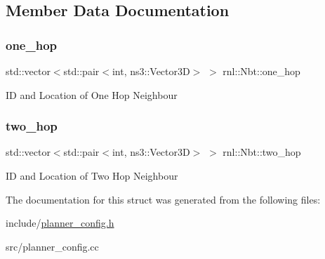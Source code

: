 \subsection{Member Data Documentation}
\mbox{\label{structrnl_1_1Nbt_aa79b864e630fe823883bb9dd511116c1}} 
\subsubsection{\texorpdfstring{one\+\_\+hop}{one\_hop}}
{\footnotesize\ttfamily std\+::vector$<$std\+::pair$<$int, ns3\+::\+Vector3D$>$ $>$ rnl\+::\+Nbt\+::one\+\_\+hop}

ID and Location of One Hop Neighbour \mbox{\label{structrnl_1_1Nbt_aba30e799d360f5f2865a2a1b4b2287e4}} 
\subsubsection{\texorpdfstring{two\+\_\+hop}{two\_hop}}
{\footnotesize\ttfamily std\+::vector$<$std\+::pair$<$int, ns3\+::\+Vector3D$>$ $>$ rnl\+::\+Nbt\+::two\+\_\+hop}

ID and Location of Two Hop Neighbour 

The documentation for this struct was generated from the following files\+:\begin{DoxyCompactItemize}
\item 
include/\hyperlink{planner__config_8h}{planner\+\_\+config.\+h}\item 
src/planner\+\_\+config.\+cc\end{DoxyCompactItemize}

